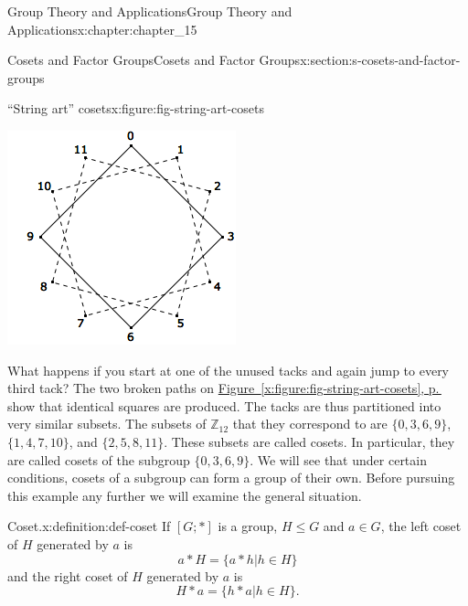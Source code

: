 \documentclass[twoside,10pt,]{book}
\newcommand{\xreffont}{\relax}
\numberwithin{equation}{section}
\begin{document}
\begin{chapterptx}{Group Theory and Applications}{}{Group Theory and Applications}{}{}{x:chapter:chapter_15}
\begin{sectionptx}{Cosets and Factor Groups}{}{Cosets and Factor Groups}{}{}{x:section:s-cosets-and-factor-groups}
\begin{figureptx}{``String art'' cosets}{x:figure:fig-string-art-cosets}{}
\begin{image}{0.15}{0.7}{0.15}
\includegraphics[width=\linewidth]{images/fig-string-art-cosets.png}
\end{image}%
\tcblower
\end{figureptx}%
What happens if you start at one of the unused tacks and again jump to every third tack? The two broken paths on \hyperref[x:figure:fig-string-art-cosets]{Figure~{\xreffont\ref{x:figure:fig-string-art-cosets}}, p.\,\pageref{x:figure:fig-string-art-cosets}} show that identical squares are produced. The tacks are thus partitioned into very similar subsets. The subsets of \(\mathbb{Z}_{12}\) that they correspond to are \(\{0,
3, 6, 9\}\), \(\{1, 4, 7, 10\}\), and \(\{2, 5, 8, 11\}\). These subsets are called cosets. In particular, they are called cosets of the subgroup \(\{0, 3, 6, 9\}\). We will see that under certain conditions, cosets of a subgroup can form a group of their own. Before pursuing this example any further we will examine the general situation.%
\begin{definition}{Coset.}{x:definition:def-coset}%
%
\label{g:notation:idm404599206864}%
If \([G;*]\) is a group, \(H \leq  G\) and \(a \in  G\), the left coset  of \(H\) generated by \(a\) is%
\begin{equation*}
a*H = \{ a*h | h \in  H\}
\end{equation*}
and the right coset of \(H\) generated by \(a\) is%
\begin{equation*}
H*a = \{h*a | h\in H\}.

\end{equation*}
\end{definition}
\end{sectionptx}
\end{chapterptx}
\end{document}
